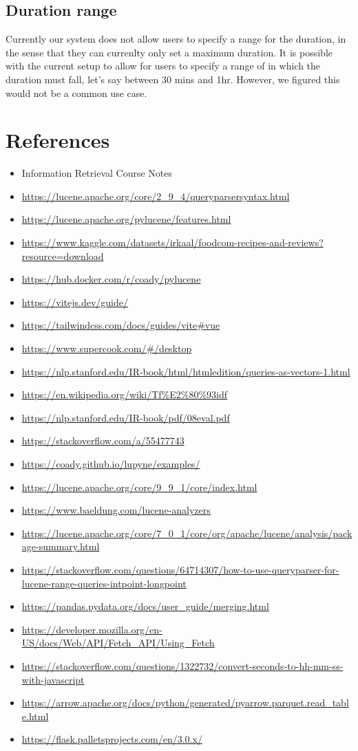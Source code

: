 \documentclass{article}
\begin{document}
\subsection{Duration range}
Currently our system does not allow users to specify a range for the duration,
in the sense that they can currenlty only set a maximum duration.
It is possible with the current setup to allow for users to specify a range of
in which the duration must fall, let's say between 30 mins and 1hr. However,
we figured this would not be a common use case.

\section{References}
\begin{itemize}
    \item Information Retrieval Course Notes
    \item \url{https://lucene.apache.org/core/2_9_4/queryparsersyntax.html}
    \item \url{https://lucene.apache.org/pylucene/features.html}
    \item \url{https://www.kaggle.com/datasets/irkaal/foodcom-recipes-and-reviews?resource=download}
    \item \url{https://hub.docker.com/r/coady/pylucene}
    \item \url{https://vitejs.dev/guide/}
    \item \url{https://tailwindcss.com/docs/guides/vite#vue}
    \item \url{https://www.supercook.com/#/desktop}
    \item \url{https://nlp.stanford.edu/IR-book/html/htmledition/queries-as-vectors-1.html}
    \item \url{https://en.wikipedia.org/wiki/Tf%E2%80%93idf}
    \item \url{https://nlp.stanford.edu/IR-book/pdf/08eval.pdf}
    \item \url{https://stackoverflow.com/a/55477743}
    \item \url{https://coady.github.io/lupyne/examples/}
    \item \url{https://lucene.apache.org/core/9_9_1/core/index.html}
    \item \url{https://www.baeldung.com/lucene-analyzers}
    \item \url{https://lucene.apache.org/core/7_0_1/core/org/apache/lucene/analysis/package-summary.html}
    \item \url{https://stackoverflow.com/questions/64714307/how-to-use-queryparser-for-lucene-range-queries-intpoint-longpoint}
    \item \url{https://pandas.pydata.org/docs/user_guide/merging.html}
    \item \url{https://developer.mozilla.org/en-US/docs/Web/API/Fetch_API/Using_Fetch}
    \item \url{https://stackoverflow.com/questions/1322732/convert-seconds-to-hh-mm-ss-with-javascript}
    \item \url{https://arrow.apache.org/docs/python/generated/pyarrow.parquet.read_table.html}
    \item \url{https://flask.palletsprojects.com/en/3.0.x/}
\end{itemize}
\end{document}

